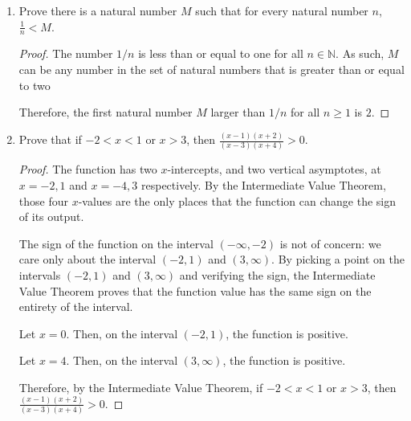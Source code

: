 \documentclass[10pt]{article}
\theoremstyle{definition}
\theoremstyle{plain}
\newcommand{\N}{\mathbb{N}}
\begin{document}
\begin{enumerate}
\item Prove there is a natural number $M$ such that for every natural number $n$, $\frac{1}{n} < M$.
  \begin{proof}
    The number $1/n$ is less than or equal to one for all $n\in\N$. As such, $M$ can be any number in the set of natural numbers that is greater than or equal to two

    \par Therefore, the first natural number $M$ larger than $1/n$ for all $n\geq 1$ is $2$.
  \end{proof}

\item Prove that if $-2 < x < 1$ or $x > 3$, then $\frac{(x-1)(x+2)}{(x-3)(x+4)} > 0$.
  \begin{proof}
    The function has two $x$-intercepts, and two vertical asymptotes, at $x=-2,1$ and $x=-4,3$ respectively. By the Intermediate Value Theorem, those four $x$-values are the only places that the function can change the sign of its output.

    \par The sign of the function on the interval $(-\infty, -2)$ is not of concern: we care only about the interval $(-2,1)$ and $(3,\infty)$. By picking a point on the intervals $(-2,1)$ and $(3,\infty)$ and verifying the sign, the Intermediate Value Theorem proves that the function value has the same sign on the entirety of the interval.

    \par Let $x=0$. Then, on the interval $(-2,1)$, the function is positive.

    \par Let $x=4$. Then, on the interval $(3,\infty)$, the function is positive.

    \par Therefore, by the Intermediate Value Theorem, if $-2 < x < 1$ or $x > 3$, then $\frac{(x-1)(x+2)}{(x-3)(x+4)} > 0$.
  \end{proof}
\end{enumerate} %
\end{document}
